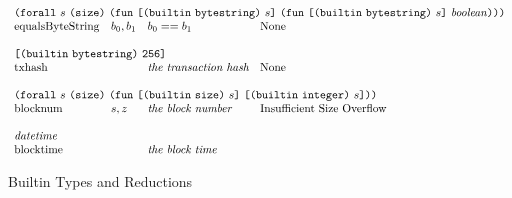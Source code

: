 \documentclass[../main.tex]{subfiles}
\begin{document}
\begin{figure*}[t]
\[\begin{array}{llll}
        \multicolumn{4}{l}{
          \forallT{s}{\sizeK{}}{
            \funT{\appT{\builtinT{\builtinBytestringType{}}}{s}}
                 {\funT{\appT{\builtinT{\builtinBytestringType{}}}{s}}
                       {\mathit{boolean}}}}}\\
        \mathrm{equalsByteString}  &   b_0 , b_1   & b_0 == b_1   &   \textrm{None}  \\
        &&\\
        
        \multicolumn{4}{l}{\appT{\builtinT{\builtinBytestringType{}}}{\size{256}}}\\
        \mathrm{txhash} & & \textit{the transaction hash}   &   \textrm{None}  \\
        &&\\
        
        \multicolumn{4}{l}{
          \forallT{s}{\sizeK{}}{
            \funT{\appT{\builtinT{\builtinSizeType{}}}{s}}
                 {\appT{\builtinT{\builtinIntegerType{}}}{s}}}}\\
        \mathrm{blocknum} & s, z & \textit{the block number}   &   \textrm{Insufficient Size Overflow}  \\
        &&\\
        
        \multicolumn{4}{l}{\mathit{datetime}}\\
        \mathrm{blocktime} & & \textit{the block time}   &   \textrm{}  \\
    \end{array}\]
    \normalsize
    \caption{Builtin Types and Reductions}
    \label{fig:Plutus_core_builtins}
\end{figure*}
\end{document}

